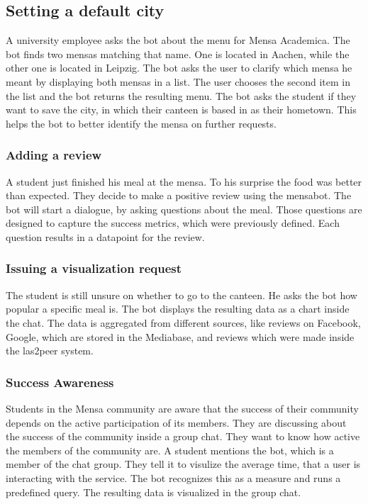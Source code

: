 \subsection{Setting a default city}
A university employee asks the bot about the menu for Mensa Academica. The bot finds two mensas matching that name. One is located in Aachen, while the other one is located in Leipzig. 
The bot asks the user to clarify which mensa he meant by displaying both mensas in a list. The user chooses the second item in the list and the bot returns the resulting menu.
The bot asks the student if they want to save the city, in which their canteen is based in as their hometown. This helps the bot to better identify the mensa on further requests.

\subsubsection{Adding a review} A student just finished his meal at the mensa. To his surprise the food was better than expected. They decide to make a positive review using the mensabot. 
The bot will start a dialogue, by asking questions about the meal. Those questions are designed to capture the success metrics, which were previously defined. Each question results in a datapoint for the review.



\subsubsection{Issuing a visualization request}
The student is still unsure on whether to go to the canteen. He asks the bot how popular a specific meal is. The bot %
displays the  resulting data as a chart inside the chat. The data is aggregated from different sources, like reviews on Facebook, Google, which are stored in the Mediabase, and reviews which were made inside the las2peer system. 

\subsubsection{Success Awareness} Students in the Mensa community are aware that the success of their community depends on the active participation of its members. They are discussing about the success of the community inside a group chat. They want to know how active the members of the community are. A student mentions the bot, which is a member of the chat group. They tell it to visulize the average time, that a user is interacting with the service. The bot recognizes this as a measure and runs a predefined query. The resulting data is visualized in the group chat.

